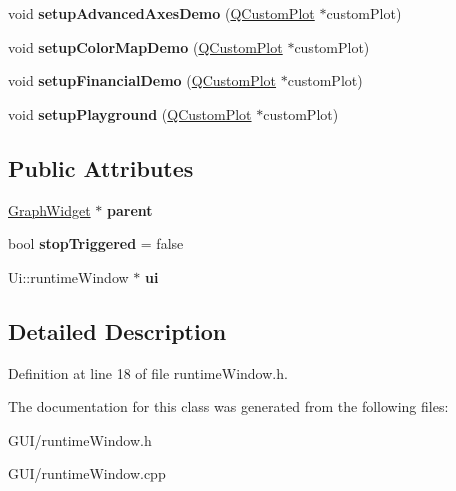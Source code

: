 \begin{DoxyCompactItemize}
\item 
\mbox{\label{classruntime_window_abbb34fa91ee0e022f75fcc68411aa2d7}} 
void {\bfseries setup\+Advanced\+Axes\+Demo} (\hyperlink{class_q_custom_plot}{Q\+Custom\+Plot} $\ast$custom\+Plot)
\item 
\mbox{\label{classruntime_window_adfdac90051e8ff37e505e681f30b6a61}} 
void {\bfseries setup\+Color\+Map\+Demo} (\hyperlink{class_q_custom_plot}{Q\+Custom\+Plot} $\ast$custom\+Plot)
\item 
\mbox{\label{classruntime_window_a45d298249534939ed04cd11fe3db790c}} 
void {\bfseries setup\+Financial\+Demo} (\hyperlink{class_q_custom_plot}{Q\+Custom\+Plot} $\ast$custom\+Plot)
\item 
\mbox{\label{classruntime_window_a478557c9db3cc82cf8527c10a10eade1}} 
void {\bfseries setup\+Playground} (\hyperlink{class_q_custom_plot}{Q\+Custom\+Plot} $\ast$custom\+Plot)
\end{DoxyCompactItemize}
\subsection*{Public Attributes}
\begin{DoxyCompactItemize}
\item 
\mbox{\label{classruntime_window_ae9ab594f9d3390877764f88f660158fa}} 
\hyperlink{class_graph_widget}{Graph\+Widget} $\ast$ {\bfseries parent}
\item 
\mbox{\label{classruntime_window_aee4b86d5d2b3e00453dd21215b550a5a}} 
bool {\bfseries stop\+Triggered} = false
\item 
\mbox{\label{classruntime_window_aa70935be1dd9463b735ecf9eaf44702c}} 
Ui\+::runtime\+Window $\ast$ {\bfseries ui}
\end{DoxyCompactItemize}


\subsection{Detailed Description}


Definition at line 18 of file runtime\+Window.\+h.



The documentation for this class was generated from the following files\+:\begin{DoxyCompactItemize}
\item 
G\+U\+I/runtime\+Window.\+h\item 
G\+U\+I/runtime\+Window.\+cpp\end{DoxyCompactItemize}
